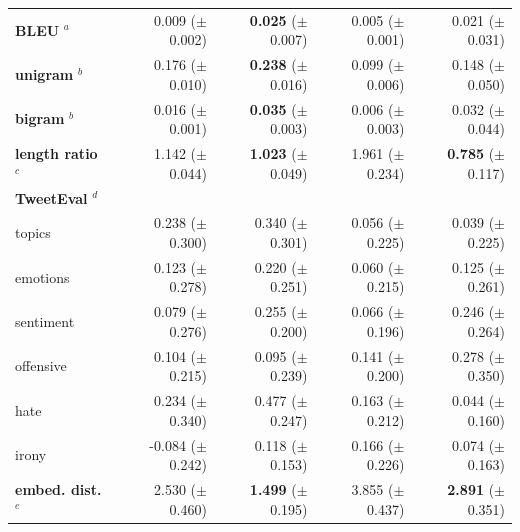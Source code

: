 \begin{table}[ht]
\begin{tabular}{l | rr | rr}
		\midrule
		\textbf{BLEU} $^a$
		& 0.009 ($\pm$ 0.002)             & \textbf{0.025} ($\pm$ 0.007) 
        & 0.005 ($\pm$ 0.001)             & 0.021 ($\pm$ 0.031) 
		\\
		\textbf{unigram} $^b$
		& 0.176 ($\pm$ 0.010)             & \textbf{0.238} ($\pm$ 0.016) 
        & 0.099 ($\pm$ 0.006)             & 0.148 ($\pm$ 0.050) 
		\\
		\textbf{bigram} $^b$
		& 0.016 ($\pm$ 0.001)             & \textbf{0.035} ($\pm$ 0.003) 
        & 0.006 ($\pm$ 0.003)             & 0.032 ($\pm$ 0.044) 
		\\
		\textbf{length ratio} $^c$ 
		& 1.142 ($\pm$ 0.044)             & \textbf{1.023} ($\pm$ 0.049) 
        & 1.961 ($\pm$ 0.234)             & \textbf{0.785} ($\pm$ 0.117) 
		\\
		\midrule
		\textbf{TweetEval} $^d$ & & & &
		\\
		\quad topics
		& 0.238 ($\pm$ 0.300)             & 0.340 ($\pm$ 0.301)          
        & 0.056 ($\pm$ 0.225)             & 0.039 ($\pm$ 0.225) 
		\\
		\quad emotions 
		& 0.123 ($\pm$ 0.278)             & 0.220 ($\pm$ 0.251)          
        & 0.060 ($\pm$ 0.215)             & 0.125 ($\pm$ 0.261) 
		\\
		\quad sentiment 
		& 0.079 ($\pm$ 0.276)             & 0.255 ($\pm$ 0.200)          
        & 0.066 ($\pm$ 0.196)             & 0.246 ($\pm$ 0.264) 
		\\
		\quad offensive 
		& 0.104 ($\pm$ 0.215)             & 0.095 ($\pm$ 0.239)          
        & 0.141 ($\pm$ 0.200)             & 0.278 ($\pm$ 0.350) 
		\\
		\quad hate 
		& 0.234 ($\pm$ 0.340)             & 0.477 ($\pm$ 0.247)          
        & 0.163 ($\pm$ 0.212)             & 0.044 ($\pm$ 0.160) 
		\\
		\quad irony 
		& -0.084 ($\pm$ 0.242)            & 0.118 ($\pm$ 0.153)          
        & 0.166 ($\pm$ 0.226)             & 0.074 ($\pm$ 0.163) 
		\\
		\midrule
		\textbf{embed. dist.} $^e$ 
		& 2.530 ($\pm$ 0.460)             & \textbf{1.499} ($\pm$ 0.195) 
        & 3.855 ($\pm$ 0.437)             & \textbf{2.891} ($\pm$ 0.351) 
		\\
		

\end{tabular}
\end{table}
